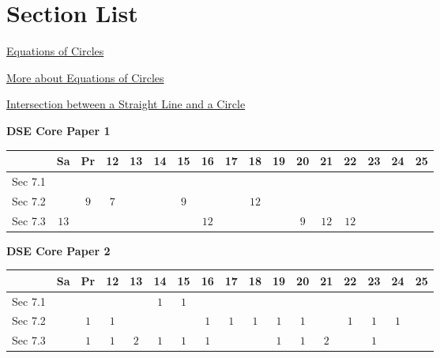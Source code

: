 \documentclass[12pt, a4paper]{article}
\begin{document}
\section*{Section List}
\begin{enumx}[label=Sec 7.\arabic*\ ]
\item \hyperref[section:5-7-1]{Equations of Circles}
\item \hyperref[section:5-7-2]{More about Equations of Circles}
\item \hyperref[section:5-7-3]{Intersection between a  Straight Line and a Circle \NF}
\end{enumx}
\begin{absolutelynopagebreak}
\begin{center}
\textbf{DSE Core Paper 1}
\end{center}
\begin{center}
\begin{tabular}{|l|c|c|c|c|c|c|c|c|c|c|c|c|c|c|c|c|}
\hline
        & Sa & Pr & 12 & 13 & 14 & 15 & 16 & 17 & 18 & 19 & 20 & 21 & 22 & 23 & 24 & 25 \\\hline\hline
Sec 7.1 &  &  &  &  &  &  &  &  &  &  &  &  &  &  &  &  \\\hline
Sec 7.2 &  &  $9$ &  $7$ &  &  &  $9$ &  &  &  $12$ &  &  &  &  &  &  &  \\\hline
Sec 7.3 &  $13$ &  &  &  &  &  &  $12$ &  &  &  &  $9$ &  $12$ &  $12$ &  &  &  \\\hline
\end{tabular}
\end{center}
\end{absolutelynopagebreak}
\begin{absolutelynopagebreak}
\begin{center}
\textbf{DSE Core Paper 2}
\end{center}
\begin{center}
\begin{tabular}{|l|c|c|c|c|c|c|c|c|c|c|c|c|c|c|c|c|}
\hline
        & Sa & Pr & 12 & 13 & 14 & 15 & 16 & 17 & 18 & 19 & 20 & 21 & 22 & 23 & 24 & 25 \\\hline\hline
Sec 7.1 &  &  &  &  &  $1$ &  $1$ &  &  &  &  &  &  &  &  &  &  \\\hline
Sec 7.2 &  &  $1$ &  $1$ &  &  &  &  $1$ &  $1$ &  $1$ &  $1$ &  $1$ &  &  $1$ &  $1$ &  $1$ &  \\\hline
Sec 7.3 &  &  $1$ &  $1$ &  $2$ &  $1$ &  $1$ &  $1$ &  &  &  $1$ &  $1$ &  $2$ &  &  $1$ &  &  \\\hline
\end{tabular}
\end{center}
\end{absolutelynopagebreak}
\end{document}
